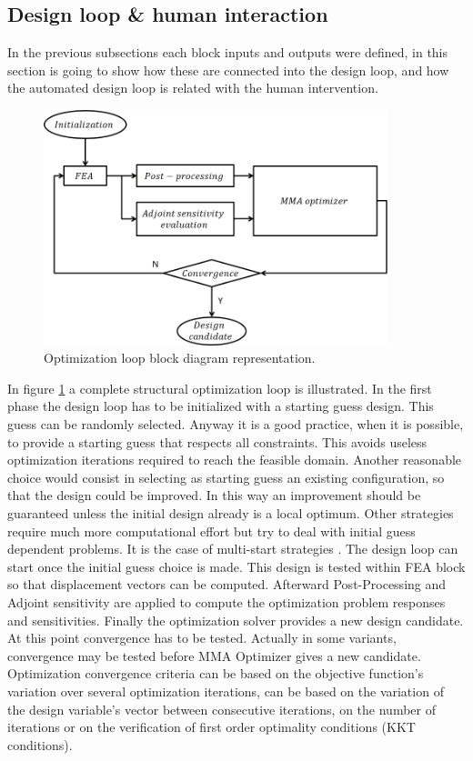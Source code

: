 \subsection{Design loop \& human interaction} 
In the previous subsections each block inputs and outputs were defined, in this section is going to show how these are connected into the design loop, and how the automated design loop is related with the human intervention.
\begin{figure}[ht]
\centering
\includegraphics[width=10cm]{images/Ch2/optimization_loop}
\caption{Optimization loop block diagram representation.}
\label{fig.2.7}
\end{figure}
In figure \ref{fig.2.7} a complete structural optimization loop is illustrated. In the first phase the design loop has to be initialized with a starting guess design. This guess can be randomly selected. Anyway it is a good practice, when it is possible, to provide a starting guess that respects all constraints. This avoids useless optimization iterations required to reach the feasible domain. Another reasonable choice would consist in selecting as starting guess an existing configuration, so that the design could be improved. In this way an improvement should be guaranteed unless the initial design already is a local optimum. Other strategies require much more computational effort but try to deal with initial guess dependent problems. It is the case of multi-start strategies \cite{dixon1975towards}. The design loop can start once the initial guess choice is made. This design is tested within FEA block so that displacement vectors can be computed. Afterward Post-Processing and Adjoint sensitivity are applied to compute the optimization problem responses and sensitivities. Finally the optimization solver provides a new design candidate. At this point convergence has to be tested. Actually in some variants, convergence may be tested before MMA Optimizer gives a new candidate. Optimization convergence criteria can be based on the objective function's variation over several optimization iterations, can be based on the variation of the design variable's vector between consecutive iterations, on the number of iterations or on the verification of first order optimality conditions (KKT conditions).
